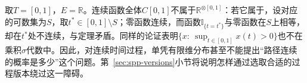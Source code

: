 取$T=[0,1]$，$E=\mathbb R$。连续函数全体$C[0,1]$不属于$\mathbb R^{\otimes[0,1]}$：若它属于，设对应的可数集为$S$，取$t^\ast\in[0,1]\setminus S$；零函数连续，而函数$\mathbb I_{\{t=t^\ast\}}$与零函数在$S$上相等，却在$t^\ast$处不连续，与定理矛盾。同样的论证表明$\{x:\ \sup_{t\in[0,1]}x(t)>0\}$也不在乘积$\sigma$代数中。因此，对连续时间过程，单凭有限维分布甚至不能提出“路径连续的概率是多少”这个问题。第~\ref{sec:spp-versions}小节将说明怎样通过选取合适的过程版本绕过这一障碍。
